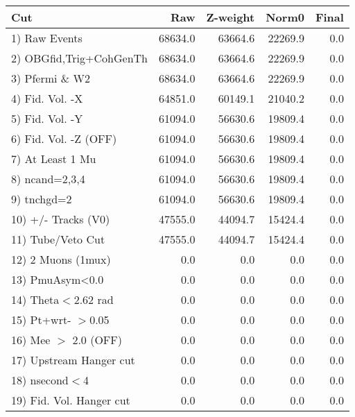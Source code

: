  \begin{table}[h!]\centering
 \begin{tabular}{||l||r|r|r|r||}
 \hline
 \hline
 Cut & Raw & Z-weight & Norm0 & Final \\
 \hline
  1) Raw Events           &     68634.0 &     63664.6 &     22269.9 &         0.0 \\
  2) OBGfid,Trig+CohGenTh &     68634.0 &     63664.6 &     22269.9 &         0.0 \\
  3) Pfermi \& W2         &     68634.0 &     63664.6 &     22269.9 &         0.0 \\
  4) Fid. Vol. -X         &     64851.0 &     60149.1 &     21040.2 &         0.0 \\
  5) Fid. Vol. -Y         &     61094.0 &     56630.6 &     19809.4 &         0.0 \\
  6) Fid. Vol. -Z (OFF)   &     61094.0 &     56630.6 &     19809.4 &         0.0 \\
  7) At Least 1 Mu        &     61094.0 &     56630.6 &     19809.4 &         0.0 \\
  8) ncand=2,3,4          &     61094.0 &     56630.6 &     19809.4 &         0.0 \\
  9) tnchgd=2             &     61094.0 &     56630.6 &     19809.4 &         0.0 \\
 10) +/- Tracks (V0)      &     47555.0 &     44094.7 &     15424.4 &         0.0 \\
 11) Tube/Veto Cut        &     47555.0 &     44094.7 &     15424.4 &         0.0 \\
 12) 2 Muons (1mux)       &         0.0 &         0.0 &         0.0 &         0.0 \\
 13) PmuAsym<0.0          &         0.0 &         0.0 &         0.0 &         0.0 \\
 14) Theta$<$2.62 rad     &         0.0 &         0.0 &         0.0 &         0.0 \\
 15) Pt+wrt- $>$0.05      &         0.0 &         0.0 &         0.0 &         0.0 \\
 16) Mee $>$ 2.0  (OFF)   &         0.0 &         0.0 &         0.0 &         0.0 \\
 17) Upstream Hanger cut  &         0.0 &         0.0 &         0.0 &         0.0 \\
 18) nsecond$<$4          &         0.0 &         0.0 &         0.0 &         0.0 \\
 19) Fid. Vol. Hanger cut &         0.0 &         0.0 &         0.0 &         0.0 \\

\end{tabular}
\end{table}
